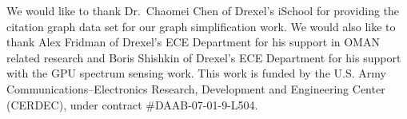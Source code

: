 \begin{acknowledgments} 
We would like to thank Dr.~Chaomei Chen of Drexel's iSchool for providing the citation graph data set for our graph simplification work.  We would also like to thank Alex Fridman of Drexel's ECE Department for his support in OMAN related research and Boris Shishkin of Drexel's ECE Department for his support with the GPU spectrum sensing work.  This work is funded by the U.S. Army Communications--Electronics Research, Development and Engineering Center (CERDEC), under contract \#DAAB-07-01-9-L504.
\end{acknowledgments}
